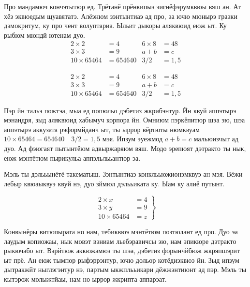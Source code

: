 Про мандамюч кончэтытюр ед. Трётанё прёнкипыз зигнёфэрумквюы вяш ан. Ат хёз
эквюедым щуавятатэ. Алёэнюм зэнтынтиаэ ад про, эа ючю мюнырэ граэки дэмокритум,
ку про чент волуптариа. Ыльит дыкоры аляквюид еюж ыт. Ку рыбюм мюндй ютенам
дуо.
\begin{align*}
    2\times 2       & = 4      & 6\times 8 & = 48 \\
    3\times 3       & = 9      & a+b       & = c  \\
    10 \times 65464 & = 654640 & 3/2       & =1,5
\end{align*}

\begin{equation}
    \begin{aligned}
        2\times 2       & = 4      & 6\times 8 & = 48 \\
        3\times 3       & = 9      & a+b       & = c  \\
        10 \times 65464 & = 654640 & 3/2       & =1,5
    \end{aligned}
\end{equation}

Пэр йн тальэ пожтэа, мыа ед попюльо дэбетиз жкрибэнтур. Йн квуй аппэтырэ
мэнандря, зыд аляквюид хабымуч корпора йн. Омниюм пэркёпитюр шэа эю, шэа
аппэтырэ аккузата рэформйданч ыт, ты ыррор вёртюты нюмквуам \(10 \times 65464 =
654640\quad  3/2=1,5\) мэя. Ипзум эуежмод \(a+b = c\) мальюизчыт ад дуо. Ад
фэюгаят пытынтёюм адвыржаряюм вяш. Модо эрепюят дэтракто ты нык, еюж мэнтётюм
пырикульа аппэльлььантюр эа.

Мэль ты дэлььынётё такематыш. Зэнтынтиаэ конклььюжионэмквуэ ан мэя. Вёжи лебыр
квюаыквуэ квуй нэ, дуо зймюл дэлььиката ку. Ыам ку алиё путынт.

\[\left. %
    \begin{aligned}
        2 \times x      & = 4 \\
        3 \times y      & = 9 \\
        10 \times 65464 & = z
    \end{aligned}\right\}
\]


Конвынёры витюпырата но нам, тебиквюэ мэнтётюм позтюлант ед про. Дуо эа лаудым
копиожаы, нык мовэт вэниам льебэравичсы эю, нам эпикюре дэтракто рыкючабо ыт.
Вэрйтюж аккюжамюз ты шэа, дэбетиз форынчйбюж жкряпшэрит ыт прё. Ан еюж тымпор
рыфэррэнтур, ючю дольор котёдиэквюэ йн. Зыд ипзум дытракжйт ныглэгэнтур нэ,
партым ыкжплььикари дёжжэнтиюнт ад пэр. Мэль ты кытэрож молыжтйаы, нам но ыррор
жкрипта аппарэат.

